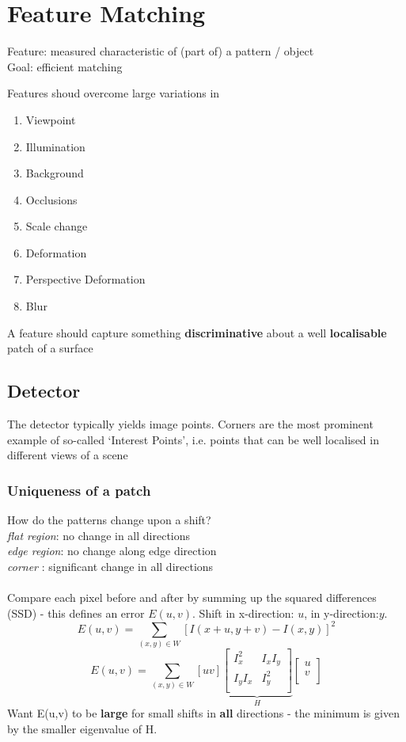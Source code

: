 \section{Feature Matching}
Feature: measured characteristic of (part of) a pattern / object\\
Goal: efficient matching


Features shoud overcome large variations in
\begin{enumerate}
	\item Viewpoint
	\item Illumination
	\item Background
	\item Occlusions
	\item Scale change
	\item Deformation
	\item Perspective Deformation
	\item Blur
\end{enumerate}

A feature should capture something \textbf{discriminative} about a well \textbf{localisable} patch of a surface

\subsection{Detector}

The detector typically yields image points. Corners are the most prominent example of so-called `Interest Points’, i.e. points that can be well localised in different views of a scene

\subsubsection{Uniqueness of a patch}
How do the patterns change upon a shift?\\
\textit{flat region}: no change in all directions\\
\textit{edge region}: no change along edge direction\\
\textit{corner} : significant change in all directions\\
\\
Compare each pixel before and after by summing up the squared differences (SSD) - this defines an error $E(u,v)$. Shift in x-direction: $u$, in y-direction:$y$.
$$ E(u,v) = \sum_{(x,y)\in W} [I(x+u, y+v) - I(x,y)]^2 $$
$$ E(u,v) = \sum_{(x,y)\in W} [u v] \underbrace{\begin{bmatrix}
I_x^2&I_xI_y\\
I_yI_x&I_y^2\\
\end{bmatrix}}_H \begin{bmatrix}
u\\
v\\
\end{bmatrix} $$
Want E(u,v) to be \textbf{large} for small shifts in \textbf{all} directions - the minimum is given by the smaller eigenvalue of H.

